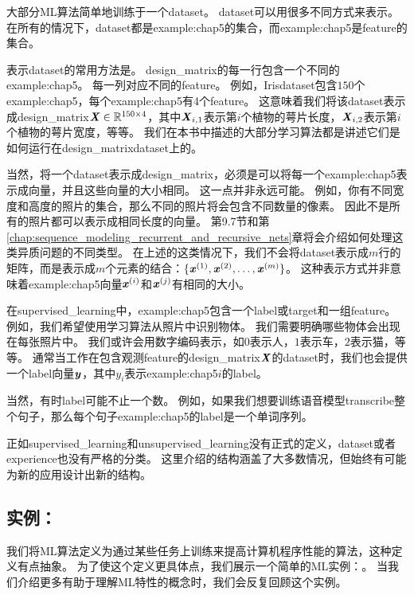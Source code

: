 大部分\gls{ML}算法简单地训练于一个\gls{dataset}。
\gls{dataset}可以用很多不同方式来表示。
在所有的情况下，\gls{dataset}都是\gls{example:chap5}的集合，而\gls{example:chap5}是\gls{feature}的集合。

表示\gls{dataset}的常用方法是。
\gls{design_matrix}的每一行包含一个不同的\gls{example:chap5}。
每一列对应不同的\gls{feature}。
例如，Iris\gls{dataset}包含$150$个\gls{example:chap5}，每个\gls{example:chap5}有4个\gls{feature}。
这意味着我们将该\gls{dataset}表示成\gls{design_matrix}$\boldsymbol{\mathit{X}}\in\mathbb{R}^{150\times 4}$，其中$\boldsymbol{\mathit{X}}_{i,1}$表示第$i$个植物的萼片长度，$\boldsymbol{\mathit{X}}_{i,2}$表示第$i$个植物的萼片宽度，等等。
我们在本书中描述的大部分学习算法都是讲述它们是如何运行在\gls{design_matrix}\gls{dataset}上的。

当然，将一个\gls{dataset}表示成\gls{design_matrix}，必须是可以将每一个\gls{example:chap5}表示成向量，并且这些向量的大小相同。
这一点并非永远可能。
例如，你有不同宽度和高度的照片的集合，那么不同的照片将会包含不同数量的像素。
因此不是所有的照片都可以表示成相同长度的向量。
第9.7节和第\ref{chap:sequence_modeling_recurrent_and_recursive_nets}章将会介绍如何处理这类异质问题的不同类型。
在上述的这类情况下，我们不会将\gls{dataset}表示成$m$行的矩阵，而是表示成$m$个元素的结合：$\{\boldsymbol{\mathit{x}}^{(1)},\boldsymbol{\mathit{x}}^{(2)},\dots,\boldsymbol{\mathit{x}}^{(m)}\}$。
这种表示方式并非意味着\gls{example:chap5}向量$\boldsymbol{\mathit{x}}^{(i)}$和$\boldsymbol{\mathit{x}}^{(j)}$有相同的大小。


在\gls{supervised_learning}中，\gls{example:chap5}包含一个\gls{label}或\gls{target}和一组\gls{feature}。
例如，我们希望使用学习算法从照片中识别物体。
我们需要明确哪些物体会出现在每张照片中。
我们或许会用数字编码表示，如$0$表示人，$1$表示车，$2$表示猫，等等。
通常当工作在包含观测\gls{feature}的\gls{design_matrix}$\boldsymbol{\mathit{X}}$的\gls{dataset}时，我们也会提供一个\gls{label}向量$\boldsymbol{\mathit{y}}$，其中$y_i$表示\gls{example:chap5}$i$的\gls{label}。

当然，有时\gls{label}可能不止一个数。
例如，如果我们想要训练语音模型\gls{transcribe}整个句子，那么每个句子\gls{example:chap5}的\gls{label}是一个单词序列。

正如\gls{supervised_learning}和\gls{unsupervised_learning}没有正式的定义，\gls{dataset}或者\gls{experience}也没有严格的分类。
这里介绍的结构涵盖了大多数情况，但始终有可能为新的应用设计出新的结构。

\subsection{实例：}
\label{sec:example_linear_regression}
我们将\gls{ML}算法定义为通过某些任务上训练来提高计算机程序性能的算法，这种定义有点抽象。
为了使这个定义更具体点，我们展示一个简单的\gls{ML}实例：。
当我们介绍更多有助于理解\gls{ML}特性的概念时，我们会反复回顾这个实例。

